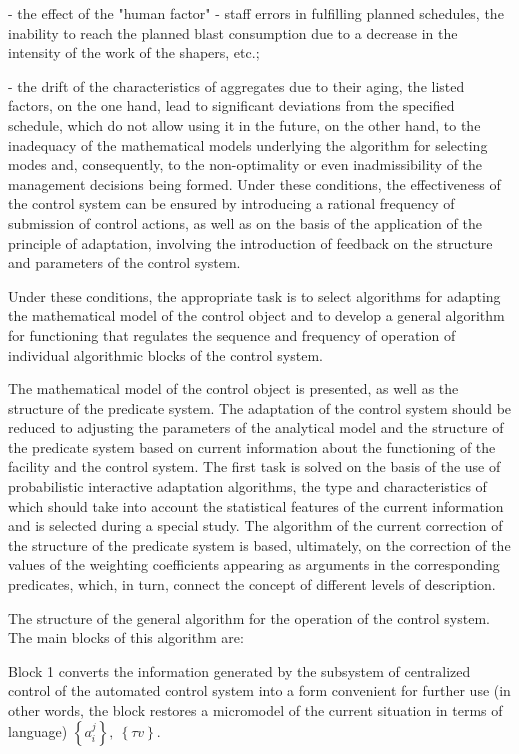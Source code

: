\begin{multicols}{2}
- the effect of the "human factor" - staff errors in fulfilling planned
schedules, the inability to reach the planned blast consumption due to a
decrease in the intensity of the work of the shapers, etc.;

- the drift of the characteristics of aggregates due to their aging, the
listed factors, on the one hand, lead to significant deviations from the
specified schedule, which do not allow using it in the future, on the
other hand, to the inadequacy of the mathematical models underlying the
algorithm for selecting modes and, consequently, to the non-optimality
or even inadmissibility of the management decisions being formed. Under
these conditions, the effectiveness of the control system can be ensured
by introducing a rational frequency of submission of control actions, as
well as on the basis of the application of the principle of adaptation,
involving the introduction of feedback on the structure and parameters
of the control system.

Under these conditions, the appropriate task is to select algorithms for
adapting the mathematical model of the control object and to develop a
general algorithm for functioning that regulates the sequence and
frequency of operation of individual algorithmic blocks of the control
system.

The mathematical model of the control object is presented, as well as
the structure of the predicate system. The adaptation of the control
system should be reduced to adjusting the parameters of the analytical
model and the structure of the predicate system based on current
information about the functioning of the facility and the control
system. The first task is solved on the basis of the use of
probabilistic interactive adaptation algorithms, the type and
characteristics of which should take into account the statistical
features of the current information and is selected during a special
study. The algorithm of the current correction of the structure of the
predicate system is based, ultimately, on the correction of the values
of the weighting coefficients appearing as arguments in the
corresponding predicates, which, in turn, connect the concept of
different levels of description.

The structure of the general algorithm for the operation of the control
system. The main blocks of this algorithm are:

Block 1 converts the information generated by the subsystem of
centralized control of the automated control system into a form
convenient for further use (in other words, the block restores a
micromodel of the current situation in terms of language)
$\left\{ a_{i}^{j} \right\},\ \left\{ \tau v \right\}$.


\end{multicols}
